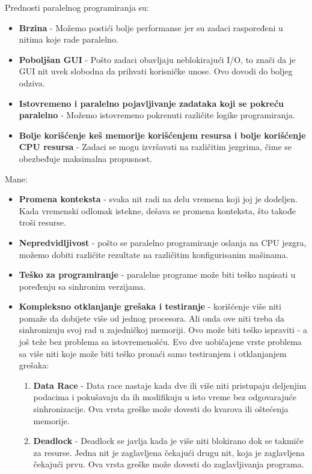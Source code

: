 \documentclass[a4paper]{article}
\begin{document}
Prednosti paralelnog programiranja su:
\begin{itemize}
\item \textbf{Brzina} - Možemo postići bolje performanse jer su zadaci raspoređeni u nitima koje rade paralelno.\cite{zoboko}
\item \textbf{Poboljšan GUI} - Pošto zadaci obavljaju neblokirajući I/O, to znači da je GUI nit uvek slobodna da prihvati korisničke unose. Ovo dovodi do boljeg odziva.\cite{zoboko}
\item \textbf{Istovremeno i paralelno pojavljivanje zadataka koji se pokreću paralelno} - Možemo istovremeno pokrenuti različite logike programiranja.\cite{zoboko}
\item \textbf{Bolje korišćenje keš memorije korišćenjem resursa i bolje korišćenje CPU resursa} - Zadaci se mogu izvršavati na različitim jezgrima, čime se obezbeđuje maksimalna propusnost.\cite{zoboko}\\
\end{itemize}
Mane:
\begin{itemize}
\item \textbf{Promena konteksta} - svaka nit radi na delu vremena koji joj je dodeljen. Kada vremenski odlomak istekne, dešava se promena konteksta, što takođe troši resurse.\cite{zoboko}
\item \textbf{Nepredvidljivost} - pošto se paralelno programiranje oslanja na CPU jezgra, možemo dobiti različite rezultate na različitim konfigurisanim mašinama.\cite{zoboko}
\item \textbf{Teško za programiranje} - paralelne programe može biti teško napisati u poređenju sa sinhronim verzijama.\cite{zoboko}
\item \textbf{Kompleksno otklanjanje grešaka i testiranje} - korišćenje više niti pomaže da dobijete više od jednog procesora. Ali onda ove niti treba da sinhronizuju svoj rad u zajedničkoj memoriji. Ovo može biti teško ispraviti - a još teže bez problema sa istovremenošću\cite{zoboko}.
Evo dve uobičajene vrste problema sa više niti koje može biti teško pronaći samo testiranjem i otklanjanjem grešaka:
\begin{enumerate}
\item \textbf{Data Race} - 
Data race nastaje kada dve ili više niti pristupaju deljenjim podacima i pokušavaju da ih modifikuju u isto vreme bez odgovarajuće sinhronizacije. Ova vrsta greške može dovesti do kvarova ili oštećenja memorije.\cite{perforce}
\item \textbf{Deadlock} - 
Deadlock se javlja kada je više niti blokirano dok se takmiče za resurse. Jedna nit je zaglavljena čekajući drugu nit, koja je zaglavljena čekajući prvu. Ova vrsta greške može dovesti do zaglavljivanja programa.\cite{perforce}
\end{enumerate}
\end{itemize}
\end{document}
